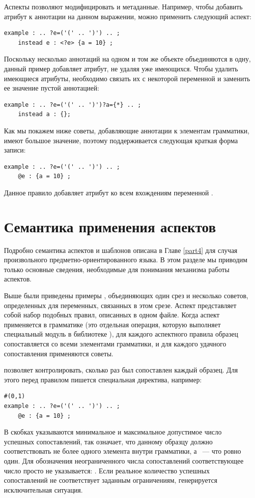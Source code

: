 Аспекты позволяют модифицировать и метаданные. Например, чтобы добавить атрибут к аннотации на данном выражении, можно применить следующий аспект:
\begin{lstlisting}
example : .. ?e=('(' .. ')') .. ;
	instead e : <?e> {a = 10} ;
\end{lstlisting}
Поскольку несколько аннотаций на одном и том же объекте объединяются в одну, данный пример добавляет атрибут, не удаляя уже имеющихся. Чтобы удалить имеющиеся атрибуты, необходимо связать их с некоторой переменной и заменить ее значение пустой аннотацией:
\begin{lstlisting}
example : .. ?e=('(' .. ')')?a={*} .. ;
	instead a : {};
\end{lstlisting}

Как мы покажем ниже советы, добавляющие аннотации к элементам грамматики, имеют большое значение, поэтому поддерживается следующая краткая форма записи:
\begin{lstlisting}
example : .. ?e=('(' .. ')') .. ;
	@e : {a = 10} ;
\end{lstlisting}
Данное правило добавляет атрибут  ко всем вхождениям переменной .

\section{Семантика применения аспектов}

Подробно семантика аспектов и шаблонов описана в Главе \ref{part4} для случая произвольного предметно-ориентированного языка. В этом разделе мы приводим только основные сведения, необходимые для понимания механизма работы аспектов.

Выше были приведены примеры , объединяющих один срез и несколько советов, определенных для переменных, связанных в этом срезе. Аспект представляет собой набор подобных правил, описанных в одном файле.
Когда аспект применяется в грамматике (это отдельная операция, которую выполняет специальный модуль в библиотеке \GRM{}), для каждого аспектного правила образец сопоставляется со всеми элементами грамматики, и для каждого удачного сопоставления применяются советы.

\GRM{} позволяет контролировать, сколько раз был сопоставлен каждый образец. Для этого перед правилом пишется специальная директива, например:
\begin{lstlisting}
#(0,1) 
example : .. ?e=('(' .. ')') .. ;
	@e : {a = 10} ;
\end{lstlisting}
В скобках указываются минимальное и максимальное допустимое число успешных сопоставлений, так  означает, что данному образцу должно соответствовать не более одного элемента внутри грамматики, а ~--- что ровно один. Для обозначения неограниченного числа сопоставлений соответствующее число просто не указывается: .
Если реальное количество успешных сопоставлений не соответствует заданным ограничениям, генерируется исключительная ситуация.

